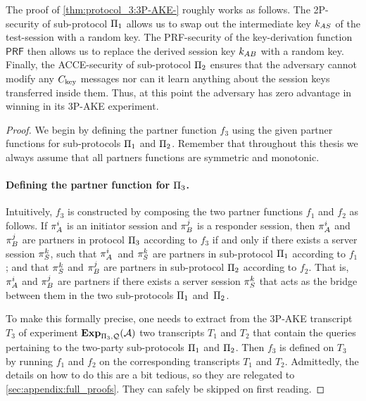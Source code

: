 The proof of \cref{thm:protocol_3:3P-AKE-} roughly works as follows.
The 2P-\akefstext security of sub-protocol $\mathrm{\Pi}_1$ allows us to swap out the intermediate key $k_{AS}$ of the test-session with a random key.
The PRF-security of the key-derivation function $\mathsf{PRF}$ then allows us to replace the derived session key $k_{AB}$ with a random key.
Finally, the ACCE-security of sub-protocol $\mathrm{\Pi}_2$ ensures that the adversary cannot modify any $C_{\mathrm{key}}$ messages
nor can it learn anything about the session keys transferred inside them.
Thus,
at this point the adversary has zero advantage in winning in its 3P-AKE experiment.



\begin{proof}
We begin by defining the partner function $f_3$ using the given partner functions for sub-protocols $\mathrm{\Pi}_1$ and $\mathrm{\Pi}_2$.
Remember that throughout this thesis we always assume that all partners functions are symmetric and monotonic.

\item
\paragraph{Defining the partner function for \texorpdfstring{$\mathrm{\Pi}_3$}{Pi 3}.}
Intuitively,
$f_3$ is constructed by composing the two partner functions $f_1$ and $f_2$ as follows.
If $\oracle[A][i]$ is an initiator session and $\oracle[B][j]$ is a responder session,
then $\oracle[A][i]$ and  $\oracle[B][j]$ are partners in protocol $\mathrm{\Pi}_3$ according to $f_3$ if and only if there exists a server session $\oracle[S][k]$,
such that $\oracle[A][i]$~and $\oracle[S][k]$ are partners in sub-protocol $\mathrm{\Pi}_1$ according to $f_1$;
and  that $\oracle[S][k]$ and $\oracle[B][j]$ are partners in sub-protocol $\mathrm{\Pi}_2$ according to $f_2$.
That is,
$\oracle[A][i]$ and $\oracle[B][j]$ are partners if there exists a server session $\oracle[S][k]$ that acts as the bridge between them in the two sub-protocols $\mathrm{\Pi}_1$ and~$\mathrm{\Pi}_2$.


To make this formally precise,
one needs to extract from the 3P-AKE transcript $T_3$ of experiment $\mathbf{Exp}_{\mathrm{\Pi}_3,\mathcal{Q}}(\mathcal{A})$
two transcripts $T_1$ and $T_2$ that contain the queries pertaining to the two-party sub-protocols $\mathrm{\Pi}_1$ and $\mathrm{\Pi}_2$.
Then $f_3$ is defined on $T_3$ by running $f_1$ and $f_2$ on the corresponding transcripts $T_1$ and $T_2$.
Admittedly,
the details on how to do this are a bit tedious,
so they are relegated to \cref{sec:appendix:full_proofs}.
They can safely be skipped on first reading.



\end{proof}
